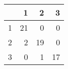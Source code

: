 \begin{tabular}{rrrr}
  \hline
 & 1 & 2 & 3 \\ 
  \hline
1 &  21 &   0 &   0 \\ 
  2 &   2 &  19 &   0 \\ 
  3 &   0 &   1 &  17 \\ 
   \hline
\end{tabular}

